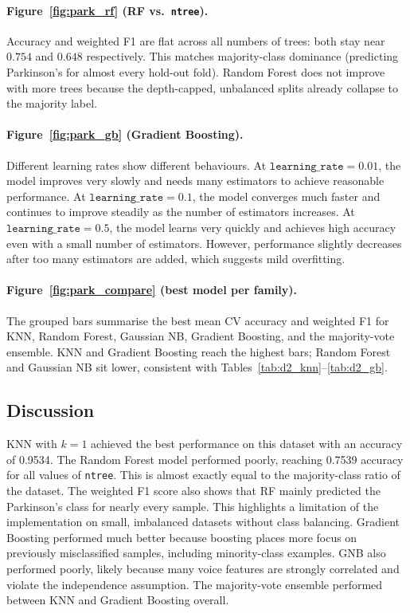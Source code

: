 \documentclass[11pt,letterpaper]{article}
\begin{document}
\paragraph{Figure~\ref{fig:park_rf} (RF vs.\ \texttt{ntree}).}
Accuracy and weighted F1 are flat across all numbers of trees: both stay near $0.754$ and $0.648$ respectively. This matches majority-class dominance (predicting Parkinson's for almost every hold-out fold). Random Forest does not improve with more trees because the depth-capped, unbalanced splits already collapse to the majority label.

\paragraph{Figure~\ref{fig:park_gb} (Gradient Boosting).}
Different learning rates show different behaviours. At
$\texttt{learning\_rate}=0.01$, the model improves very slowly and needs many
estimators to achieve reasonable performance. At
$\texttt{learning\_rate}=0.1$, the model converges much faster and continues
to improve steadily as the number of estimators increases. At
$\texttt{learning\_rate}=0.5$, the model learns very quickly and achieves
high accuracy even with a small number of estimators. However, performance
slightly decreases after too many estimators are added, which suggests mild
overfitting.

\paragraph{Figure~\ref{fig:park_compare} (best model per family).}
The grouped bars summarise the best mean CV accuracy and weighted F1 for KNN, Random Forest, Gaussian NB, Gradient Boosting, and the majority-vote ensemble. KNN and Gradient Boosting reach the highest bars; Random Forest and Gaussian NB sit lower, consistent with Tables~\ref{tab:d2_knn}--\ref{tab:d2_gb}.

\subsection{Discussion}

KNN with $k=1$ achieved the best performance on this dataset with an
accuracy of 0.9534. The Random Forest model performed poorly, reaching
0.7539 accuracy for all values of \texttt{ntree}. This is almost exactly
equal to the majority-class ratio of the dataset. The weighted F1 score also
shows that RF mainly predicted the Parkinson's class for nearly every
sample. This highlights a limitation of the implementation on small,
imbalanced datasets without class balancing. Gradient Boosting performed
much better because boosting places more focus on previously misclassified
samples, including minority-class examples. GNB also performed poorly,
likely because many voice features are strongly correlated and violate the
independence assumption. The majority-vote ensemble performed between KNN
and Gradient Boosting overall.
\end{document}
